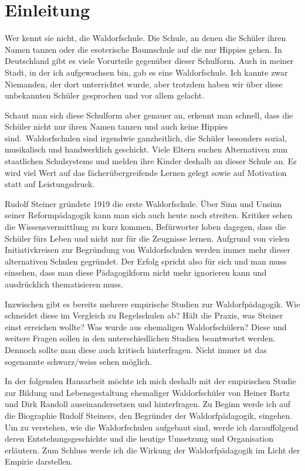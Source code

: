 \section{Einleitung}

Wer kennt sie nicht, die Waldorfschule. Die Schule, an denen die Schüler ihren Namen tanzen oder die esoterische Baumschule auf die nur Hippies gehen. In Deutschland gibt es viele Vorurteile gegenüber dieser Schulform. Auch in meiner Stadt, in der ich aufgewachsen bin, gab es eine Waldorfschule. Ich kannte zwar Niemanden, der dort unterrichtet wurde, aber trotzdem haben wir über diese unbekannten Schüler gesprochen und vor allem gelacht. 

Schaut man sich diese Schulform aber genauer an, erkennt man schnell, dass die Schüler nicht nur ihren Namen tanzen und auch keine Hippies sind. Waldorfschulen sind irgendwie ganzheitlich, die Schüler besonders sozial, musikalisch und handwerklich geschickt. Viele Eltern suchen Alternativen zum staatlichen Schulsystems und melden ihre Kinder deshalb an dieser Schule an. Es wird viel Wert auf das fächerübergreifende Lernen gelegt sowie auf Motivation statt auf Leistungsdruck. 

Rudolf Steiner gründete 1919 die erste Waldorfschule. Über Sinn und Unsinn seiner Reformpädagogik kann man sich auch heute noch streiten. Kritiker sehen die Wissensvermittlung zu kurz kommen, Befürworter loben dagegen, dass die Schüler fürs Leben und nicht nur für die Zeugnisse lernen. Aufgrund von vielen Initiativkreisen zur Begründung von Waldorfschulen werden immer mehr dieser alternativen Schulen gegründet. Der Erfolg spricht also für sich und man muss einsehen, dass man diese Pädagogikform nicht mehr ignorieren kann und ausdrücklich thematisieren muss. 

Inzwischen gibt es bereits mehrere empirische Studien zur Waldorfpädagogik. Wie schneidet diese im Vergleich zu Regelschulen ab? Hält die Praxis, was Steiner einst erreichen wollte? Was wurde aus ehemaligen Waldorfschülern? Diese und weitere Fragen sollen in den unterschiedlichen Studien beantwortet werden. Dennoch sollte man diese auch kritisch hinterfragen. Nicht immer ist das sogenannte schwarz/weiss sehen möglich. 

In der folgenden Hausarbeit möchte ich mich deshalb mit der empirischen Studie zur Bildung und Lebensgestaltung ehemaliger Waldorfschüler von Heiner Bartz und Dirk Randoll auseinandersetzen und hinterfragen. Zu Beginn werde ich auf die Biographie Rudolf Steiners, den Begründer der Waldorfpädagogik, eingehen. Um zu verstehen, wie die Waldorfschulen aufgebaut sind, werde ich darauffolgend deren Entstehungsgeschichte und die heutige Umsetzung und Organisation erläutern. Zum Schluss werde ich die Wirkung der Waldorfpädagogik im Licht der Empirie darstellen.